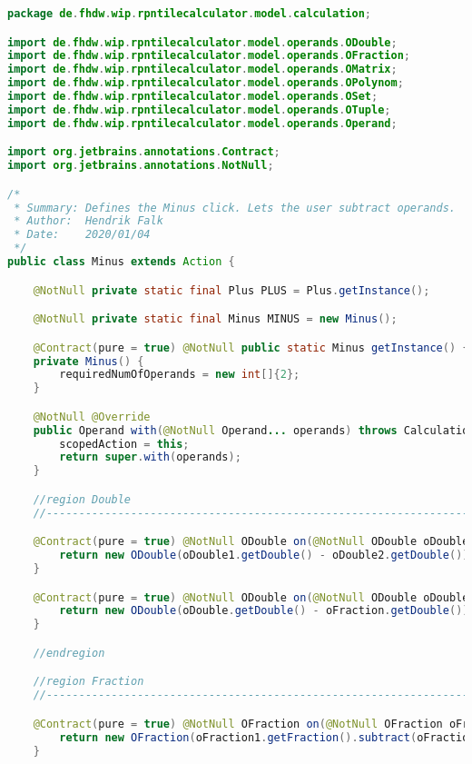\begin{lstlisting}[caption=Minus (Falk),label=list:Minus,language=Java]
package de.fhdw.wip.rpntilecalculator.model.calculation;

import de.fhdw.wip.rpntilecalculator.model.operands.ODouble;
import de.fhdw.wip.rpntilecalculator.model.operands.OFraction;
import de.fhdw.wip.rpntilecalculator.model.operands.OMatrix;
import de.fhdw.wip.rpntilecalculator.model.operands.OPolynom;
import de.fhdw.wip.rpntilecalculator.model.operands.OSet;
import de.fhdw.wip.rpntilecalculator.model.operands.OTuple;
import de.fhdw.wip.rpntilecalculator.model.operands.Operand;

import org.jetbrains.annotations.Contract;
import org.jetbrains.annotations.NotNull;

/*
 * Summary: Defines the Minus click. Lets the user subtract operands.
 * Author:  Hendrik Falk
 * Date:    2020/01/04
 */
public class Minus extends Action {

    @NotNull private static final Plus PLUS = Plus.getInstance();

    @NotNull private static final Minus MINUS = new Minus();

    @Contract(pure = true) @NotNull public static Minus getInstance() { return MINUS; }
    private Minus() {
        requiredNumOfOperands = new int[]{2};
    }

    @NotNull @Override
    public Operand with(@NotNull Operand... operands) throws CalculationException {
        scopedAction = this;
        return super.with(operands);
    }

    //region Double
    //------------------------------------------------------------------------------------

    @Contract(pure = true) @NotNull ODouble on(@NotNull ODouble oDouble1, @NotNull ODouble oDouble2) {
        return new ODouble(oDouble1.getDouble() - oDouble2.getDouble());
    }

    @Contract(pure = true) @NotNull ODouble on(@NotNull ODouble oDouble, @NotNull OFraction oFraction) {
        return new ODouble(oDouble.getDouble() - oFraction.getDouble());
    }

    //endregion

    //region Fraction
    //------------------------------------------------------------------------------------

    @Contract(pure = true) @NotNull OFraction on(@NotNull OFraction oFraction1, @NotNull OFraction oFraction2) {
        return new OFraction(oFraction1.getFraction().subtract(oFraction2.getFraction()));
    }


\end{lstlisting}
